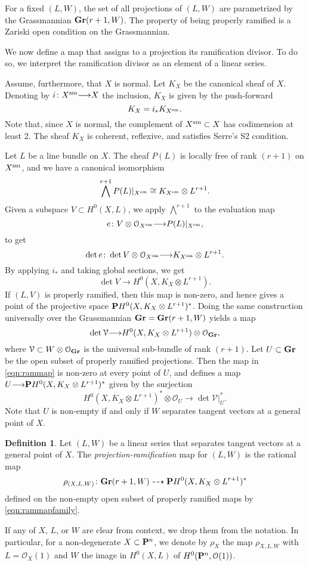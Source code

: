\documentclass[11pt,reqno]{amsart}
\theoremstyle{plain}
\theoremstyle{definition}
\newtheorem{definition}[theorem]{Definition}
\theoremstyle{remark}
\numberwithin{equation}{section}
\renewcommand{\to}{{\longrightarrow}}
\numberwithin{equation}{section}
\renewcommand{\O}{\mathcal O}
\begin{document}
For a fixed $(L, W)$, the set of all projections of $(L, W)$ are parametrized by the Grassmannian $\Gr(r+1, W)$.
The property of being properly ramified is a Zariski open condition on the Grassmannian.

We now define a map that assigns to a projection its ramification divisor.
To do so, we interpret the ramification divisor as an element of a linear series.

Assume, furthermore, that $X$ is normal.
Let $K_X$ be the canonical sheaf of $X$.
Denoting by $i \from X^{\rm sm} \to X$ the inclusion, $K_X$ is given by the push-forward
\[ K_X = i_* K_{X^{\rm sm}}.\]
Note that, since $X$ is normal, the complement of $X^{\rm sm} \subset X$ has codimension at least 2.
The sheaf $K_X$ is coherent, reflexive, and satisfies Serre's S2 condition.

Let $L$ be a line bundle on $X$.
The sheaf $P(L)$ is locally free of rank $(r+1)$ on $X^{\rm sm}$, and we have a canonical isomorphism
\[ \bigwedge^{r+1} P(L) |_{X^{\rm sm}} \cong K_{X^{\rm sm}} \otimes L^{r+1}.\]
Given a subspace $V \subset H^0(X, L)$, we apply $\bigwedge^{r+1}$ to the evaluation map
\[ e \from V \otimes \O_{X^{\rm sm}} \to P(L)|_{X^{\rm sm}},\]
to get
\[ \det e \from \det V \otimes \O_{X^{\rm sm}} \to K_{X^{\rm sm}} \otimes L^{r+1}. \]
By applying $i_*$ and taking global sections, we get
\[ \det V \to H^0(X, K_X \otimes L^{r+1}).\]
If $(L, V)$ is properly ramified, then this map is non-zero, and hence gives a point of the projective space $\P H^0(X, K_X \otimes L^{r+1})^*$.
Doing the same construction universally over the Grassmannian $\Gr = \Gr(r+1, W)$ yields a map
\begin{equation}\label{eqn:rammap}
  \det \mathcal V \to H^0(X, K_X \otimes L^{r+1}) \otimes \O_{\Gr},
\end{equation}
where $\mathcal V \subset W \otimes \O_{\Gr}$ is the universal sub-bundle of rank $(r+1)$.
Let $U \subset \Gr$ be the open subset of properly ramified projections.
Then the map in \eqref{eqn:rammap} is non-zero at every point of $U$, and defines a map $U \to \P H^0(X, K_X \otimes L^{r+1})^*$ given by the surjection
\begin{equation}\label{eqn:rammapfamily}
  H^0(X, K_X \otimes L^{r+1})^* \otimes \O_{U} \to \det \mathcal V|_U^*.
\end{equation}
Note that $U$ is non-empty if and only if $W$ separates tangent vectors at a general point of $X$.
\begin{definition}
  \label{def:ProjectionRamification}
  Let $(L, W)$ be a linear series that separates tangent vectors at a general point of $X$.
  The \emph{projection-ramification} map for $(L,W)$ is the rational map
  \[
    \rho_{(X,L,W)} \from \Gr(r+1, W) \dashrightarrow \P H^0(X, K_X \otimes L^{r+1})^*
  \]
  defined on the non-empty open subset of properly ramified maps by \eqref{eqn:rammapfamily}.
\end{definition}
If any of $X$, $L$, or $W$ are clear from context, we drop them from the notation.
In particular, for a non-degenerate $X \subset \P^n$, we denote by $\rho_X$ the map $\rho_{X,L,W}$  with $L = \O_X(1)$ and $W$ the image in $H^0(X, L)$ of $H^0(\P^n, \O(1))$.
\end{document}
